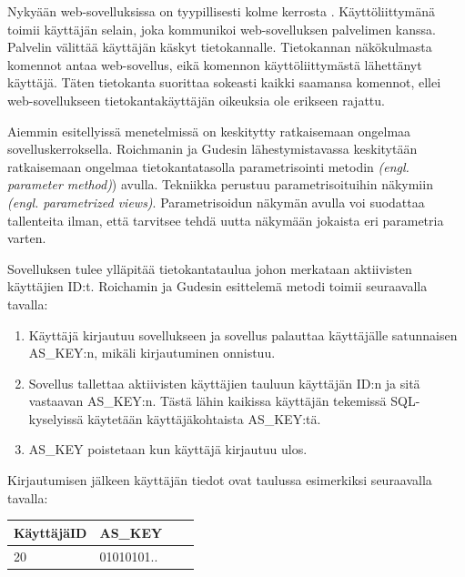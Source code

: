 \documentclass[finnish]{tktltiki2}
\theoremstyle{definition}
\theoremstyle{remark}
\begin{document}
				 
		 Nykyään web-sovelluksissa on tyypillisesti kolme kerrosta \cite{access}\cite{3tier}. Käyttöliittymänä toimii käyttäjän selain, joka kommunikoi web-sovelluksen palvelimen kanssa. Palvelin välittää käyttäjän käskyt tietokannalle. Tietokannan näkökulmasta komennot antaa web-sovellus, eikä komennon käyttöliittymästä lähettänyt käyttäjä. Täten tietokanta suorittaa sokeasti kaikki saamansa komennot, ellei web-sovellukseen tietokantakäyttäjän oikeuksia ole erikseen rajattu.
		

		 
		
		Aiemmin esitellyissä menetelmissä on keskitytty ratkaisemaan ongelmaa sovelluskerroksella. Roichmanin ja Gudesin lähestymistavassa keskitytään ratkaisemaan ongelmaa tietokantatasolla parametrisointi metodin \textit{(engl. parameter method)}) avulla. Tekniikka perustuu parametrisoituihin näkymiin \textit{(engl. parametrized views)}. Parametrisoidun näkymän avulla voi suodattaa tallenteita ilman, että tarvitsee tehdä uutta näkymään jokaista eri parametria varten.
		
		Sovelluksen tulee ylläpitää tietokantataulua johon merkataan aktiivisten käyttäjien ID:t. Roichamin ja Gudesin esittelemä metodi toimii seuraavalla tavalla:
		\begin{enumerate}
			\item Käyttäjä kirjautuu sovellukseen ja sovellus palauttaa käyttäjälle satunnaisen AS\_KEY:n, mikäli kirjautuminen onnistuu.
			
			\item Sovellus tallettaa aktiivisten käyttäjien tauluun käyttäjän ID:n ja sitä vastaavan AS\_KEY:n. Tästä lähin kaikissa käyttäjän tekemissä SQL-kyselyissä käytetään käyttäjäkohtaista AS\_KEY:tä.
			
			\item AS\_KEY poistetaan kun käyttäjä kirjautuu ulos.
		\end{enumerate}
		
		Kirjautumisen jälkeen käyttäjän tiedot ovat taulussa esimerkiksi seuraavalla tavalla:
	
		\begin{center}
		\begin{tabular}{| l | l | l | l |}
			\hline
			KäyttäjäID & AS\_KEY \\ \hline
			\hline
			20 &  01010101.. \\
			\hline
		\end{tabular}
		\end{center}
	
\end{document}
